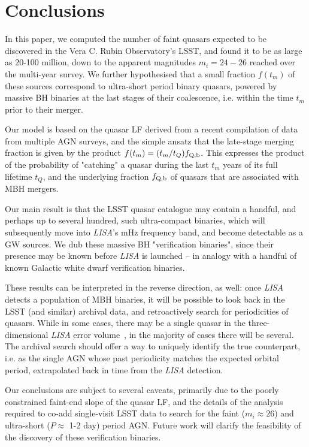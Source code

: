 \documentclass[fleqn,usenatbib]{mnras}
\begin{document}
\vspace{\baselineskip}
\section{Conclusions}
\label{sec:conclusion}

In this paper, we computed the number of faint quasars expected to be discovered in the Vera C. Rubin Observatory's LSST, and found it to be as large as 20-100 million, down to the apparent magnitudes $m_i=24-26$ reached over the multi-year survey.  We further hypothesised that a small fraction $f(t_m)$ of these sources correspond to ultra-short period binary quasars, powered by massive BH binaries at the last stages of their coalescence, i.e. within the time $t_m$ prior to their merger.

Our model is based on the quasar LF derived from a recent compilation of data from multiple AGN surveys, and the simple ansatz that the late-stage merging fraction is given by the product $f(t_m)=(t_m/t_Q)f_{\rm Q,b}$.  This expresses the product of the probability of "catching" a quasar during the last $t_m$ years of its full lifetime $t_Q$, and the underlying fraction $f_{\rm Q,b}$ of quasars that are associated with MBH mergers.

Our main result is that the LSST quasar catalogue may contain a handful, and perhaps up to several hundred, such ultra-compact binaries, which will subsequently move into {\it LISA}'s mHz frequency band, and become detectable as a GW sources.   We dub these massive BH "verification binaries", since their presence may be known before {\it LISA} is launched -- in analogy with  a handful of known Galactic white dwarf verification binaries.

These results can be interpreted in the reverse direction, as well:  once {\it LISA} detects a population of MBH binaries, it will be possible to look back in the LSST (and similar) archival data, and retroactively search for periodicities of quasars.  While in some cases, there may be a single quasar  in the three-dimensional {\it LISA} error volume~\citep{Kocsis+2006}, in the majority of cases there will be several.  The archival search should offer a way to uniquely identify the true counterpart, i.e. as the single AGN whose past periodicity matches the expected orbital period, extrapolated back in time from the {\it LISA} detection.

Our conclusions are subject to several caveats, primarily due to the poorly constrained faint-end slope of the quasar LF, and the details of the analysis required to co-add single-visit LSST data to search for the faint ($m_i\approx 26$) and ultra-short ($P\approx$ 1-2 day) period AGN.   Future work will clarify the feasibility of the discovery of these verification binaries.
\end{document}
